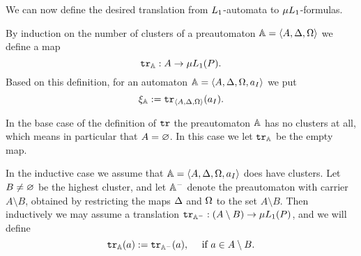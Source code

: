 \noindent
We can now define the desired translation from $L_{1}$-automata to 
$\mu L_{1}$-formulas.


\begin{definition}
\label{d:tr}
By induction on the number of clusters of a preautomaton $\mathbb{A} = \langle{A,\Delta,
\Omega}\rangle$ we define a map 
\[
\mathtt{tr}_{\mathbb{A}}: A \to \mu L_{1}(P).
\]
Based on this definition, for an automaton $\mathbb{A} = \langle{A,\Delta,\Omega, a_{I}}\rangle$ 
we put
\[
\xi_{\mathbb{A}} \mathrel{:=} \mathtt{tr}_{\langle{A,\Delta,\Omega}\rangle}(a_{I}).
\]

In the base case of the definition of $\mathtt{tr}$ the preautomaton $\mathbb{A}$ has no 
clusters at all, which means in particular that $A = \varnothing$.
In this case we let $\mathtt{tr}_{\mathbb{A}}$ be the empty map.

In the inductive case we assume that $\mathbb{A} = \langle{A,\Delta,\Omega, a_{I}}\rangle$ does 
have clusters. 
Let $B \neq \varnothing$ be the highest cluster, and let $\mathbb{A}^{-}$ denote the 
preautomaton with carrier $A \setminus B$, obtained by restricting the maps 
$\Delta$ and $\Omega$ to the set $A \setminus B$.
Then inductively we may assume a translation $\mathtt{tr}_{\mathbb{A}^{-}}: (A \setminus B)
\to \mu L_{1}(P)$, and we will define
\[
\ytr_{\bbA}(a) \isdef \ytr_{\bbA^{-}}(a), \quad\text{ if } a \in A \setminus B.
\]


\end{definition}
